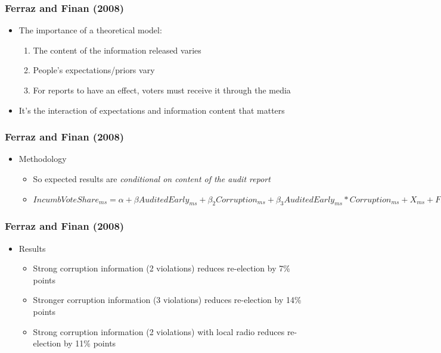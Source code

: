 \documentclass[xcolor=x11names,compress]{beamer}\usepackage[]{graphicx}\usepackage[]{color}
\renewcommand{\(}{\begin{columns}}
\renewcommand{\)}{\end{columns}}
\newcommand{\<}[1]{\begin{column}{#1}}
\renewcommand{\>}{\end{column}}
\begin{document}
\begin{frame}
\frametitle{Ferraz and Finan (2008)}
\begin{itemize}
\item The importance of a theoretical model:
\begin{enumerate}
\item The content of the information released varies
\item People's expectations/priors vary
\item For reports to have an effect, voters must receive it through the media
\end{enumerate}
\item It's the interaction of expectations and information content that matters
\end{itemize}
\end{frame}

\begin{frame}
\frametitle{Ferraz and Finan (2008)}
\begin{itemize}
\item Methodology
\begin{itemize}
\item So expected results are \textit{conditional on content of the audit report}
\pause
\item $IncumbVoteShare_{ms} = \alpha + \beta AuditedEarly_{ms} + \beta_2 Corruption_{ms} + \beta_3 AuditedEarly_{ms}*Corruption_{ms} + X_{ms} + FE_{s} + \epsilon_{ms}$
\end{itemize}
\end{itemize}
\end{frame}

\begin{frame}
\frametitle{Ferraz and Finan (2008)}
\begin{itemize}
\item Results
\begin{itemize}
\item Strong corruption information (2 violations) reduces re-election by 7\% points
\item Stronger corruption information (3 violations) reduces re-election by 14\% points
\item Strong corruption information (2 violations) with local radio reduces re-election by 11\% points
\end{itemize}
\end{itemize}
\end{frame}
\end{document}
